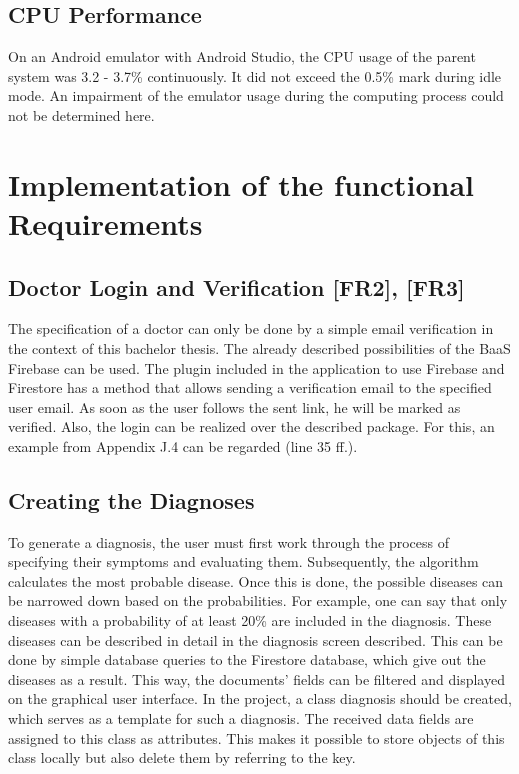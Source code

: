 \subsection{CPU Performance}
On an Android emulator with Android Studio, the CPU usage of the parent system was 3.2 - 3.7\% continuously. It did not exceed the 0.5\% mark during idle mode. An impairment of the emulator usage during the computing process could not be determined here.

\section{Implementation of the functional Requirements}
\subsection{Doctor Login and Verification [FR2], [FR3]}
The specification of a doctor can only be done by a simple email verification in the context of this bachelor thesis. The already described possibilities of the BaaS Firebase can be used. The plugin included in the application to use Firebase and Firestore has a method that allows sending a verification email to the specified user email. As soon as the user follows the sent link, he will be marked as verified. Also, the login can be realized over the described package. For this, an example from Appendix J.4 can be regarded (line 35 ff.).
\subsection{Creating the Diagnoses}
To generate a diagnosis, the user must first work through the process of specifying their symptoms and evaluating them. Subsequently, the algorithm calculates the most probable disease. Once this is done, the possible diseases can be narrowed down based on the probabilities. For example, one can say that only diseases with a probability of at least 20\% are included in the diagnosis. These diseases can be described in detail in the diagnosis screen described. This can be done by simple database queries to the Firestore database, which give out the diseases as a result. This way, the documents' fields can be filtered and displayed on the graphical user interface. In the project, a class diagnosis should be created, which serves as a template for such a diagnosis. The received data fields are assigned to this class as attributes. This makes it possible to store objects of this class locally but also delete them by referring to the key.
